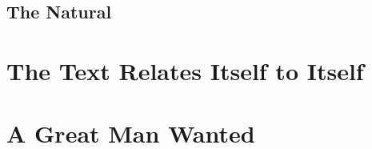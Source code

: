 
\subsection{The Natural} %
\label{sub:the_natural}



\section{The Text Relates Itself to Itself} %
\label{sec:the_text_relates_itself_to_itself}


\section{A Great Man Wanted} %
\label{sec:a_great_man_wanted}


